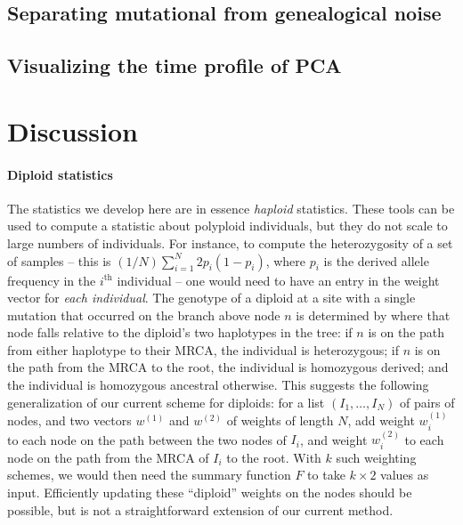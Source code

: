 \documentclass{article}
\begin{document}
\subsection*{Separating mutational from genealogical noise}


\subsection*{Visualizing the time profile of PCA}



\section*{Discussion}


\paragraph{Diploid statistics}
The statistics we develop here are in essence \emph{haploid} statistics.
These tools can be used to compute a statistic about polyploid individuals,
but they do not scale to large numbers of individuals.
For instance, to compute the heterozygosity of a set of samples
-- this is $(1/N) \sum_{i=1}^N 2 p_i (1-p_i)$, where $p_i$ is the derived allele frequency
in the $i^\text{th}$ individual --
one would need to have an entry in the weight vector for \emph{each individual}.
The genotype of a diploid at a site with a single mutation that occurred on the branch above node $n$
is determined by where that node falls relative to the diploid's two haplotypes in the tree:
if $n$ is on the path from either haplotype to their MRCA, the individual is heterozygous;
if $n$ is on the path from the MRCA to the root, the individual is homozygous derived;
and the individual is homozygous ancestral otherwise.
This suggests the following generalization of our current scheme for diploids:
for a list $(I_1, \ldots, I_N)$ of pairs of nodes,
and two vectors $w^{(1)}$ and $w^{(2)}$ of weights of length $N$,
add weight $w^{(1)}_i$ to each node on the path between the two nodes of $I_i$,
and weight $w^{(2)}_i$ to each node on the path from the MRCA of $I_i$ to the root.
With $k$ such weighting schemes, we would then need the summary function $F$
to take $k \times 2$ values as input.
Efficiently updating these ``diploid'' weights on the nodes should be possible,
but is not a straightforward extension of our current method.
\end{document}
